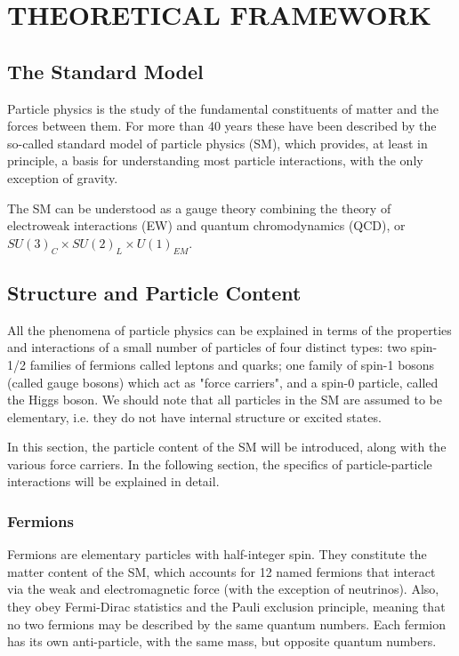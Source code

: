 %
%
%
%



\chapter{THEORETICAL FRAMEWORK}
\section{The Standard Model}
Particle physics is the study of the fundamental constituents of matter and the forces between them. For more than 40 years these have been described by the so-called standard model of particle physics (SM), which provides, at least in principle, a basis for understanding most particle interactions, with the only exception of gravity.

The SM can be understood as a gauge theory combining the theory of electroweak interactions (EW) and quantum chromodynamics (QCD), or $SU(3)_{C}\times SU(2)_{L} \times U(1)_{EM}$. 

\section{Structure and Particle Content}
All the phenomena of particle physics can be explained in terms of the properties and interactions of a small number of particles of four distinct types: two spin-1/2 families of fermions called leptons and quarks; one family of spin-1 bosons (called gauge bosons) which act as "force carriers", and a spin-0 particle, called the Higgs boson. We should note that all particles in the SM are assumed to be elementary, i.e. they do not have internal structure or excited states.

In this section, the particle content of the SM will be introduced, along with the various force carriers. In the following section, the specifics of particle-particle interactions will be explained in detail.

\subsection{Fermions}
Fermions are elementary particles with half-integer spin. They constitute the matter content of the SM, which accounts for 12 named fermions that interact via the weak and electromagnetic force (with the exception of neutrinos). Also, they obey Fermi-Dirac statistics and the Pauli exclusion principle, meaning that no two fermions may be described by the same quantum numbers. Each fermion has its own anti-particle, with the same mass, but opposite quantum numbers.

